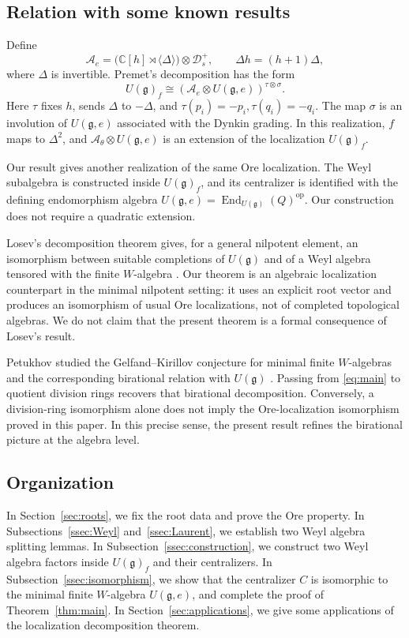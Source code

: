 \documentclass[12pt,a4paper]{amsart}
\numberwithin{equation}{section}
\theoremstyle{definition}
\theoremstyle{remark}
\newcommand{\C}{\mathbb{C}}
\newcommand{\g}{\mathfrak g}
\newcommand{\D}{\mathcal D}
\newcommand{\End}{\operatorname{End}}
\newcommand{\Uf}{U(\g)_f}
\begin{document}
\subsection{Relation with some known results}
Define
\[
 \mathcal A_e=
    \bigl(\C[h]\rtimes\langle\Delta\rangle\bigr)\otimes \D^+_s,
 \qquad \Delta h=(h+1)\Delta,
\]
where \(\Delta\) is invertible.
Premet's decomposition \cite[Corollary~5.1(iii)--(iv)]{Pr2}
has the form
\begin{equation}\label{eq:Premet-comparison}
 \Uf\cong(\mathcal A_e\otimes U(\g,e))^{\tau\otimes\sigma}.
\end{equation}
Here \(\tau\) fixes \(h\), sends \(\Delta\) to \(-\Delta\), and
$\tau(p_i)=-p_i, \tau(q_i)=-q_i$.
The map \(\sigma\)  is an involution of $U(\g,e)$
associated with the Dynkin grading.
In this realization, \(f\) maps to \(\Delta^2\), and
\(\mathcal A_\theta\otimes U(\g,e)\) is an extension of the
localization $\Uf$.

Our result gives another realization of the same Ore localization.
The Weyl subalgebra is constructed inside \(\Uf\), and its
centralizer is identified with the defining endomorphism algebra $U(\g,e)=\End_{U(\g)}(Q)^{\mathrm{op}}$.
Our construction does not require a quadratic extension.


Losev's decomposition theorem gives, for a general nilpotent element, an
isomorphism between suitable completions of $U(\g)$ and of a Weyl algebra
tensored with the finite $W$-algebra \cite{L10}.  Our theorem is an
algebraic localization counterpart in the minimal nilpotent setting: it
uses an explicit root vector and produces an isomorphism of
usual Ore localizations, not  of completed topological algebras.
We do not claim that the present theorem is a formal consequence of
Losev's result.

Petukhov studied the Gelfand--Kirillov conjecture for minimal finite
$W$-algebras and the corresponding birational relation with $U(\g)$
\cite{Petukhov}.  Passing from \eqref{eq:main} to quotient division rings
recovers that birational decomposition.  Conversely, a division-ring
isomorphism alone does not imply the Ore-localization isomorphism proved in
this paper.  In this precise sense, the present result refines the
birational picture at the algebra level.


\subsection{Organization}
In Section~\ref{sec:roots}, we fix the root data and prove the Ore property.
In Subsections~\ref{ssec:Weyl} and~\ref{ssec:Laurent}, we establish two Weyl algebra splitting lemmas.
In Subsection~\ref{ssec:construction}, we construct two Weyl algebra factors inside $\Uf$ and their
centralizers.
In Subsection~\ref{ssec:isomorphism},  we show that  the centralizer $C$ is isomorphic to the
minimal finite \(W\)-algebra $U(\g,e)$,  and complete the proof of
Theorem~\ref{thm:main}.
In Section~\ref{sec:applications}, we give some applications of the localization decomposition theorem.
\end{document}
